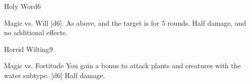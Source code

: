 \begin{spellsection}{Holy Word}{6}
\begin{spellheader}
\end{spellheader}
\begin{spellcontent}
    \begin{spelltargetinginfo}
    \end{spelltargetinginfo}
    \begin{spelleffects}
        \begin{spellattack}{Magic vs. Will}
            \spellsuccess {}[d6].
            \spellcritical As above, and the target is \dazed for 5 rounds.
            \spellfailure Half damage, and no additional effects.
        \end{spellattack}
    \end{spelleffects}
\end{spellcontent}
\begin{spellfooter}
\end{spellfooter}
\end{spellsection}

\begin{spellsection}{Horrid Wilting}{9}
\begin{spellheader}
\end{spellheader}
\begin{spellcontent}
    \begin{spelltargetinginfo}
    \end{spelltargetinginfo}
    \begin{spelleffects}
        \begin{spellattack}{Magic vs. Fortitude}
            \spellspecial You gain a  bonus to attack plants and creatures with the water subtype.
            \spellsuccess {}[d6]
            \spellfailure Half damage.
        \end{spellattack}
    \end{spelleffects}
\end{spellcontent}
\begin{spellfooter}
\end{spellfooter}
\end{spellsection}

